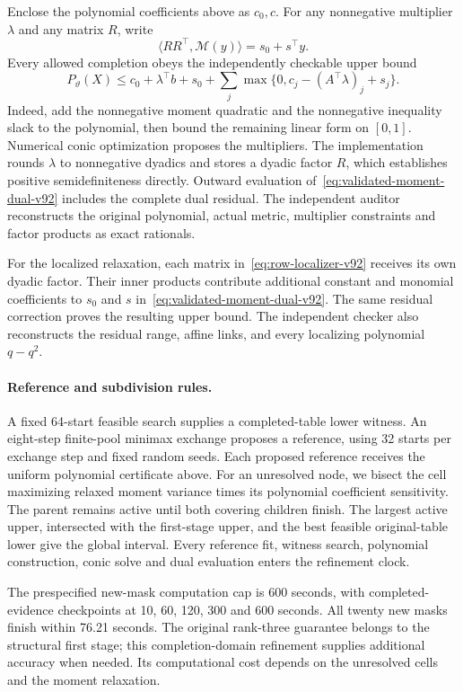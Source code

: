 Enclose the polynomial coefficients above as $c_0,c$. For any nonnegative multiplier $\lambda$ and any matrix $R$, write
\[
 \langle RR^\top,\mathcal M(y)\rangle=s_0+s^\top y.
\]
Every allowed completion obeys the independently checkable upper bound
\begin{equation}
 P_\vartheta(X)\le c_0+\lambda^\top b+s_0
       +\sum_j\max\{0,c_j-(A^\top\lambda)_j+s_j\}.
 \label{eq:validated-moment-dual-v92}
\end{equation}
Indeed, add the nonnegative moment quadratic and the nonnegative inequality slack to the polynomial, then bound the remaining linear form on $[0,1]$. Numerical conic optimization proposes the multipliers. The implementation rounds $\lambda$ to nonnegative dyadics and stores a dyadic factor $R$, which establishes positive semidefiniteness directly. Outward evaluation of~\eqref{eq:validated-moment-dual-v92} includes the complete dual residual. The independent auditor reconstructs the original polynomial, actual metric, multiplier constraints and factor products as exact rationals.

For the localized relaxation, each matrix in~\eqref{eq:row-localizer-v92} receives its own dyadic factor. Their inner products contribute additional constant and monomial coefficients to $s_0$ and $s$ in~\eqref{eq:validated-moment-dual-v92}. The same residual correction proves the resulting upper bound. The independent checker also reconstructs the residual range, affine links, and every localizing polynomial $q-q^2$.

\paragraph{Reference and subdivision rules.}
A fixed 64-start feasible search supplies a completed-table lower witness. An eight-step finite-pool minimax exchange proposes a reference, using 32 starts per exchange step and fixed random seeds. Each proposed reference receives the uniform polynomial certificate above. For an unresolved node, we bisect the cell maximizing relaxed moment variance times its polynomial coefficient sensitivity. The parent remains active until both covering children finish. The largest active upper, intersected with the first-stage upper, and the best feasible original-table lower give the global interval. Every reference fit, witness search, polynomial construction, conic solve and dual evaluation enters the refinement clock.

The prespecified new-mask computation cap is 600 seconds, with completed-evidence checkpoints at 10, 60, 120, 300 and 600 seconds. All twenty new masks finish within 76.21 seconds. The original rank-three guarantee belongs to the structural first stage; this completion-domain refinement supplies additional accuracy when needed. Its computational cost depends on the unresolved cells and the moment relaxation.




